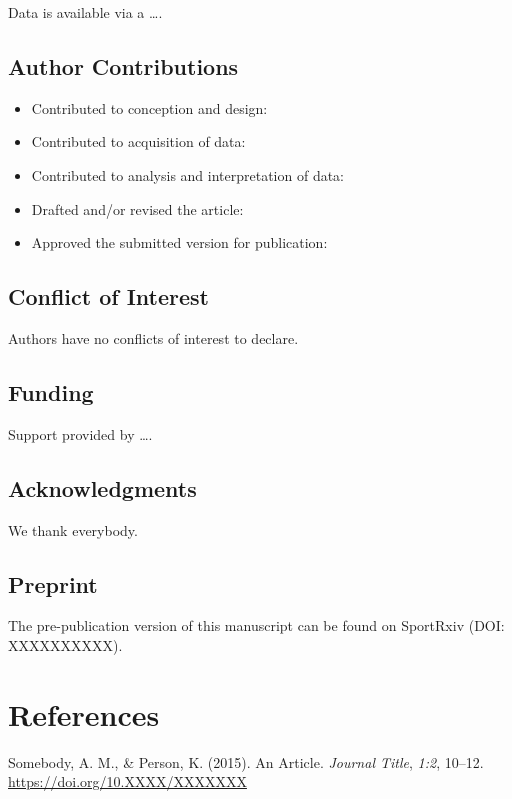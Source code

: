 \documentclass[]{cik}%
\newlength{\cslhangindent}
\newlength{\cslentryspacingunit} %
\newenvironment{CSLReferences}[2] %
 {%
  \setlength{\parindent}{0pt}
  \ifodd #1
  \let\oldpar\par
  \def\par{\hangindent=\cslhangindent\oldpar}
  \fi
  \setlength{\parskip}{#2\cslentryspacingunit}
 }%
 {}
\begin{document}
Data is available via a \ldots.

\hypertarget{author-contributions}{%
\subsection{Author Contributions}\label{author-contributions}}

\begin{itemize}
\tightlist
\item
  Contributed to conception and design:
\item
  Contributed to acquisition of data:
\item
  Contributed to analysis and interpretation of data:
\item
  Drafted and/or revised the article:
\item
  Approved the submitted version for publication:
\end{itemize}

\hypertarget{conflict-of-interest}{%
\subsection{Conflict of Interest}\label{conflict-of-interest}}

Authors have no conflicts of interest to declare.

\hypertarget{funding}{%
\subsection{Funding}\label{funding}}

Support provided by \ldots.

\hypertarget{acknowledgments}{%
\subsection{Acknowledgments}\label{acknowledgments}}

We thank everybody.

\hypertarget{preprint}{%
\subsection{Preprint}\label{preprint}}

The pre-publication version of this manuscript can be found on SportRxiv
(DOI: XXXXXXXXXX).

\newpage

\hypertarget{references}{%
\section{References}\label{references}}

\hypertarget{refs}{}
\begin{CSLReferences}{1}{0}
\leavevmode{}%
Somebody, A. M., \& Person, K. (2015). An Article. \emph{Journal Title},
\emph{1:2}, 10--12. \url{https://doi.org/10.XXXX/XXXXXXX}

\end{CSLReferences}
\end{document}
